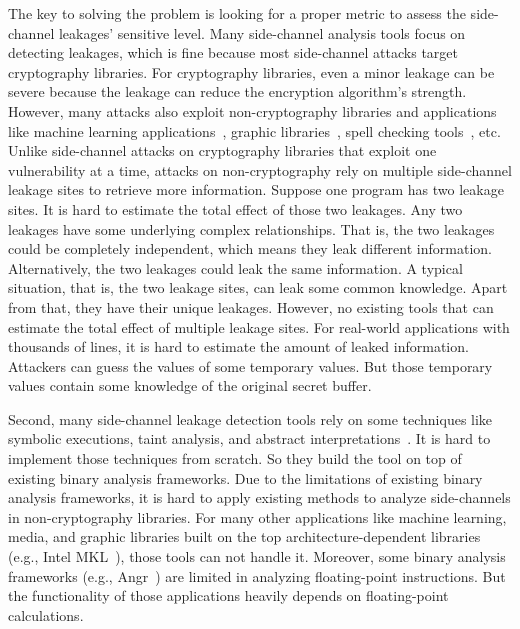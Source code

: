The key to solving the problem is looking for a proper metric to assess the side-channel leakages' sensitive level. Many side-channel analysis tools focus on detecting leakages, which is fine because most side-channel attacks target cryptography libraries. For cryptography libraries, even a minor leakage can be severe because the leakage can reduce the encryption algorithm's strength. However, many attacks also exploit non-cryptography libraries and applications like machine learning applications~\cite{yan2020cache,hong2018security}, graphic libraries~\cite{wang2019unveiling}, spell checking tools~\cite{xu2015controlled}, etc. Unlike side-channel attacks on cryptography libraries that exploit one vulnerability at a time, attacks on non-cryptography rely on multiple side-channel leakage sites to retrieve more information. Suppose one program has two leakage sites. It is hard to estimate the total effect of those two leakages. Any two leakages have some underlying complex relationships. That is, the two leakages could be completely independent, which means they leak different information. Alternatively, the two leakages could leak the same information. A typical situation, that is, the two leakage sites, can leak some common knowledge. Apart from that, they have their unique leakages. However, no existing tools that can estimate the total effect of multiple leakage sites. For real-world applications with thousands of lines, it is hard to estimate the amount of leaked information. Attackers can guess the values of some temporary values. But those temporary values contain some knowledge of the original secret buffer.

Second, many side-channel leakage detection tools rely on some techniques like symbolic executions, taint analysis, and abstract interpretations~\cite{203878,182946,Brotzman19Casym,236338}. It is hard to implement those techniques from scratch. So they build the tool on top of existing binary analysis frameworks. Due to the limitations of existing binary analysis frameworks, it is hard to apply existing methods to analyze side-channels in non-cryptography libraries. For many other applications like machine learning, media, and graphic libraries built on the top architecture-dependent libraries (e.g., Intel MKL~\cite{wang2014intel}), those tools can not handle it. Moreover, some binary analysis frameworks (e.g., Angr~\cite{shoshitaishvili2016state}) are limited in analyzing floating-point instructions. But the functionality of those applications heavily depends on floating-point calculations.

